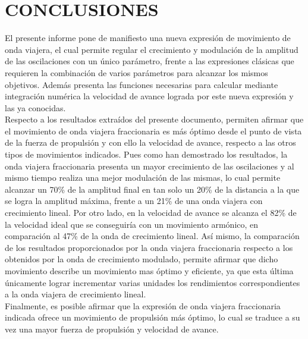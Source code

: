 \section{CONCLUSIONES} \label{sec:conclusiones}
El presente informe pone de manifiesto una nueva expresión de movimiento de onda viajera, el cual permite regular el crecimiento y modulación de la amplitud de las oscilaciones con un único parámetro, frente a las expresiones clásicas que requieren la combinación de varios parámetros para alcanzar los mismos objetivos. Además presenta las funciones necesarias para calcular mediante integración numérica la velocidad de avance lograda por este nueva expresión y las ya conocidas.\\

Respecto a los resultados extraídos del presente documento, permiten afirmar que el movimiento de onda viajera fraccionaria es más óptimo desde el punto de vista de la fuerza de propulsión y con ello la velocidad de avance, respecto a las otros tipos de movimientos indicados. Pues como han demostrado los resultados, la onda viajera fraccionaria presenta un mayor crecimiento de las oscilaciones y al mismo tiempo realiza una mejor modulación de las mismas, lo cual permite alcanzar un 70\% de la amplitud final en tan solo un 20\% de la distancia a la que se logra la amplitud máxima, frente a un 21\% de una onda viajera con crecimiento lineal. Por otro lado, en la velocidad de avance se alcanza el 82\% de la velocidad ideal que se conseguiría con un movimiento armónico, en comparación al 47\% de la onda de crecimiento lineal. Así mismo, la comparación de los resultados proporcionados por la onda viajera fraccionaria respecto a los obtenidos por la onda de crecimiento modulado, permite afirmar que dicho movimiento describe un movimiento mas óptimo y eficiente, ya que esta última únicamente lograr incrementar varias unidades los rendimientos correspondientes a la onda viajera de crecimiento lineal.\\

Finalmente, es posible afirmar que la expresión de onda viajera fraccionaria indicada ofrece un movimiento de propulsión más óptimo, lo cual se traduce a su vez una mayor fuerza de propulsión y velocidad de avance.
